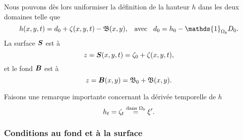 \noindent Nous pouvons dès lors uniformiser la définition de la hauteur $h$ dans les deux domaines telle que
\begin{equation}
	h(x, y, t) = d_0 + \zeta (x, y, t) - \fond (x, y),\hspace{3mm}\text{avec}\hspace{3mm} d_0 = h_0 - \mathds{1}_{\Omega_b} D_0. \label{eq:deep}
\end{equation}
\noindent La surface $\boldsymbol{S} $ est à
\begin{equation}
	z = \boldsymbol{S}(x, y, t) = \zeta_0 + \zeta(x, y, t),\label{def:surface}
\end{equation}
\noindent et le fond $\boldsymbol{B}$ est à
\begin{equation}
z = \boldsymbol{B}(x, y) = \mathfrak{B}_0 + \mathfrak{B}(x, y).\label{def:fond}
\end{equation}
\begin{refe}
	Faisons une remarque importante concernant la dérivée temporelle de $h$
	\begin{equation}
	h_t = \zeta_t \overset{\text{dans $\Omega_b$}}{=} \xi'.\label{eq:der_t_h}\\
	\end{equation}	
\end{refe}


\subsubsection{Conditions au fond et à la surface}

